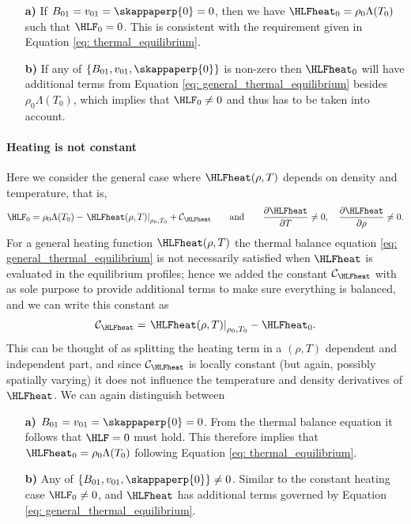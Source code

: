 \begin{enumerate}
  \item[\textbf{a)}] If $B_{01} = v_{01} = \skappaperp{0} = 0$, then we have $\HLFheat_0 = \rho_0\Lambda(T_0)$ such that $\HLF_0 = 0$. This is consistent with the requirement given in Equation \eqref{eq: thermal_equilibrium}.
  \item[\textbf{b)}] If any of $\{B_{01}, v_{01}, \skappaperp{0}\}$ is non-zero then $\HLFheat_0$ will have additional terms from Equation \eqref{eq: general_thermal_equilibrium} besides $\rho_0\Lambda(T_0)$, which implies that $\HLF_0 \neq 0$ and thus has to be taken into account.
\end{enumerate}

\paragraph{Heating is not constant}
Here we consider the general case where $\HLFheat(\rho, T)$ depends on density and temperature, that is,
\begin{equation}
  \HLF_0 = \rho_0\Lambda(T_0) - \left. \HLFheat(\rho, T)\right|_{\rho_0, T_0} + \mathcal{C}_\HLFheat
  \qquad
  \text{and}
  \qquad
  \frac{\partial \HLFheat}{\partial T} \neq 0,
  \quad
  \frac{\partial \HLFheat}{\partial \rho} \neq 0.
\end{equation}
For a general heating function $\HLFheat(\rho, T)$ the thermal balance equation \eqref{eq: general_thermal_equilibrium} is not necessarily satisfied when $\HLFheat$ is evaluated in the equilibrium profiles; hence we added the constant $\mathcal{C}_\HLFheat$ with as sole purpose to provide additional terms to make sure everything is balanced, and we can write this constant as
\begin{equation}
  \mathcal{C}_\HLFheat = \left.\HLFheat(\rho, T)\right|_{\rho_0, T_0} - \HLFheat_0.
\end{equation}
This can be thought of as splitting the heating term in a $(\rho ,T)$ dependent and independent part, and since $\mathcal{C}_\HLFheat$ is locally constant (but again, possibly spatially varying) it does not influence the temperature and density derivatives of $\HLFheat$. We can again distinguish between

\begin{enumerate}
  \item[\textbf{a)}] $B_{01} = v_{01} = \skappaperp{0} = 0$. From the thermal balance equation it follows that $\HLF = 0$ must hold. This therefore implies that $\HLFheat_0 = \rho_0 \Lambda(T_0)$ following Equation \ref{eq: thermal_equilibrium}.
  \item[\textbf{b)}] Any of $\{B_{01}, v_{01}, \skappaperp{0}\} \neq 0$. Similar to the constant heating case $\HLF_0 \neq 0$, and $\HLFheat$ has additional terms governed by Equation \eqref{eq: general_thermal_equilibrium}.
\end{enumerate}

